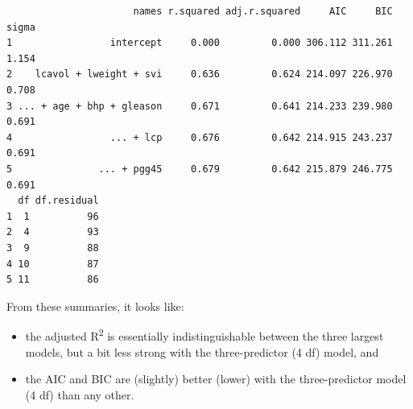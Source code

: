 \documentclass[]{book}
\newenvironment{Shaded}{\begin{snugshade}}{\end{snugshade}}
\newcommand{\KeywordTok}[1]{\textcolor[rgb]{0.13,0.29,0.53}{\textbf{#1}}}
\newcommand{\DecValTok}[1]{\textcolor[rgb]{0.00,0.00,0.81}{#1}}
\newcommand{\StringTok}[1]{\textcolor[rgb]{0.31,0.60,0.02}{#1}}
\newcommand{\OperatorTok}[1]{\textcolor[rgb]{0.81,0.36,0.00}{\textbf{#1}}}
\newcommand{\NormalTok}[1]{#1}
\providecommand{\tightlist}{%
  \setlength{\itemsep}{0pt}\setlength{\parskip}{0pt}}
\theoremstyle{definition}
\theoremstyle{definition}
\theoremstyle{definition}
\theoremstyle{remark}
\begin{document}
\begin{Shaded}
\end{Shaded}

\begin{verbatim}
                      names r.squared adj.r.squared     AIC     BIC sigma
1                 intercept     0.000         0.000 306.112 311.261 1.154
2    lcavol + lweight + svi     0.636         0.624 214.097 226.970 0.708
3 ... + age + bhp + gleason     0.671         0.641 214.233 239.980 0.691
4                 ... + lcp     0.676         0.642 214.915 243.237 0.691
5               ... + pgg45     0.679         0.642 215.879 246.775 0.691
  df df.residual
1  1          96
2  4          93
3  9          88
4 10          87
5 11          86
\end{verbatim}

From these summaries, it looks like:

\begin{itemize}
\tightlist
\item
  the adjusted R\textsuperscript{2} is essentially indistinguishable
  between the three largest models, but a bit less strong with the
  three-predictor (4 df) model, and
\item
  the AIC and BIC are (slightly) better (lower) with the three-predictor
  model (4 df) than any other.
\end{itemize}
\end{document}
